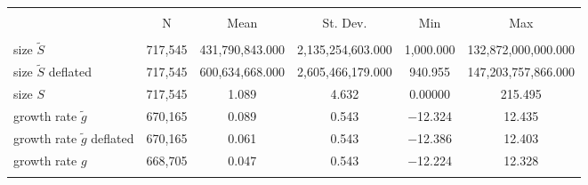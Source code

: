 
\begin{tabular}{@{\extracolsep{5pt}}lccccc} 
\\[-1.8ex]\hline 
\hline \\[-1.8ex] 
 & \multicolumn{1}{c}{N} & \multicolumn{1}{c}{Mean} & \multicolumn{1}{c}{St. Dev.} & \multicolumn{1}{c}{Min} & \multicolumn{1}{c}{Max} \\ 
\hline \\[-1.8ex] 
size $\tilde{S}$ & 717,545 & 431,790,843.000 & 2,135,254,603.000 & 1,000.000 & 132,872,000,000.000 \\ 
size $\tilde{S}$ deflated & 717,545 & 600,634,668.000 & 2,605,466,179.000 & 940.955 & 147,203,757,866.000 \\ 
size $S$ & 717,545 & 1.089 & 4.632 & 0.00000 & 215.495 \\ 
growth rate $\tilde{g}$ & 670,165 & 0.089 & 0.543 & $-$12.324 & 12.435 \\ 
growth rate $\tilde{g}$ deflated & 670,165 & 0.061 & 0.543 & $-$12.386 & 12.403 \\ 
growth rate $g$ & 668,705 & 0.047 & 0.543 & $-$12.224 & 12.328 \\ 
\hline \\[-1.8ex] 
\end{tabular} 
